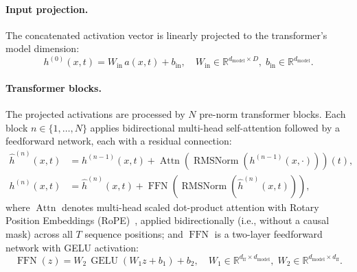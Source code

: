 \documentclass{article}
\begin{document}
\paragraph{Input projection.}
The concatenated activation vector is linearly projected to the transformer's model dimension:
\begin{equation}
  h^{(0)}(x, t) = W_{\mathrm{in}} \, a(x, t) + b_{\mathrm{in}},
  \quad W_{\mathrm{in}} \in \mathbb{R}^{d_{\mathrm{model}} \times D}, \;
  b_{\mathrm{in}} \in \mathbb{R}^{d_{\mathrm{model}}}.
\end{equation}

\paragraph{Transformer blocks.}
The projected activations are processed by $N$ pre-norm transformer blocks. Each block $n \in
\{1, \ldots, N\}$ applies bidirectional multi-head self-attention followed by a feedforward
network, each with a residual connection:
\begin{align}
  \hat{h}^{(n)}(x, t) &= h^{(n-1)}(x, t) +
    \operatorname{Attn}\!\left(
      \operatorname{RMSNorm}\!\left(h^{(n-1)}(x, \cdot)\right)
    \right)\!(t), \\
  h^{(n)}(x, t) &= \hat{h}^{(n)}(x, t) +
    \operatorname{FFN}\!\left(
      \operatorname{RMSNorm}\!\left(\hat{h}^{(n)}(x, t)\right)
    \right),
\end{align}
where $\operatorname{Attn}$ denotes multi-head scaled dot-product attention with Rotary
Position Embeddings (RoPE)~\cite{su2024roformer}, applied bidirectionally (i.e., without a
causal mask) across all $T$ sequence positions; and $\operatorname{FFN}$ is a two-layer
feedforward network with GELU activation:
\begin{equation}
  \operatorname{FFN}(z) = W_2 \, \operatorname{GELU}(W_1 z + b_1) + b_2,
  \quad W_1 \in \mathbb{R}^{d_{\mathrm{ff}} \times d_{\mathrm{model}}}, \;
  W_2 \in \mathbb{R}^{d_{\mathrm{model}} \times d_{\mathrm{ff}}}.
\end{equation}
\end{document}
